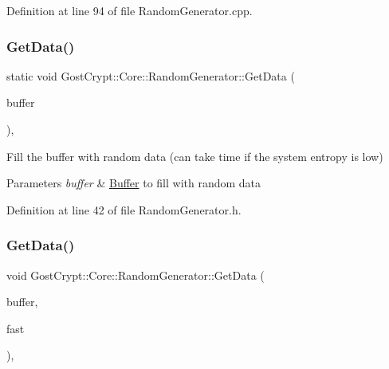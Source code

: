 Definition at line 94 of file Random\+Generator.\+cpp.

\mbox{\label{class_gost_crypt_1_1_core_1_1_random_generator_abbb77e1064c935fc8b86007025afe535}} 
\subsubsection{\texorpdfstring{Get\+Data()}{GetData()}\hspace{0.1cm}{\footnotesize\ttfamily [1/2]}}
{\footnotesize\ttfamily static void Gost\+Crypt\+::\+Core\+::\+Random\+Generator\+::\+Get\+Data (\begin{DoxyParamCaption}\item[{\hyperlink{class_gost_crypt_1_1_buffer_ptr}{Buffer\+Ptr} \&}]{buffer }\end{DoxyParamCaption})\hspace{0.3cm}{\ttfamily [inline]}, {\ttfamily [static]}}



Fill the buffer with random data (can take time if the system entropy is low) 


\begin{DoxyParams}{Parameters}
{\em buffer} & \hyperlink{class_gost_crypt_1_1_buffer}{Buffer} to fill with random data \\
\hline
\end{DoxyParams}


Definition at line 42 of file Random\+Generator.\+h.

\mbox{\label{class_gost_crypt_1_1_core_1_1_random_generator_aabdea2fe9f1a142868792fc87c578e2a}} 
\subsubsection{\texorpdfstring{Get\+Data()}{GetData()}\hspace{0.1cm}{\footnotesize\ttfamily [2/2]}}
{\footnotesize\ttfamily void Gost\+Crypt\+::\+Core\+::\+Random\+Generator\+::\+Get\+Data (\begin{DoxyParamCaption}\item[{\hyperlink{class_gost_crypt_1_1_buffer_ptr}{Buffer\+Ptr} \&}]{buffer,  }\item[{bool}]{fast }\end{DoxyParamCaption})\hspace{0.3cm}{\ttfamily [static]}, {\ttfamily [protected]}}



